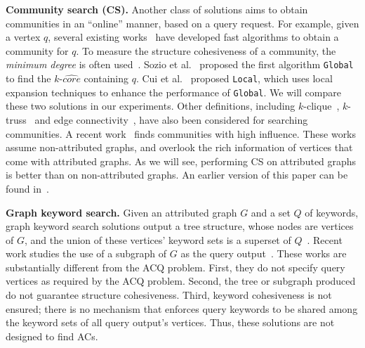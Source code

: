 \textbf{Community search (CS).}  Another class of solutions aims to obtain communities in an ``online'' manner, based on a query request. For example, given a vertex $q$, several existing works~\cite{KDD2010,local2014,vldb2015,online-sigmod2013,k-truss2014} have developed fast algorithms to obtain a community for $q$.
To measure the structure cohesiveness of a community, the {\it minimum degree} is often used~\cite{KDD2010,local2014,vldb2015}. Sozio et al.~\cite{KDD2010} proposed the first algorithm {\tt Global} to find the $k$-$\widehat{core}$ containing $q$.
Cui et al.~\cite{local2014} proposed {\tt Local}, which uses local expansion techniques to enhance the performance of {\tt Global}. We will compare these two solutions in our experiments.
Other definitions, including $k$-clique~\cite{online-sigmod2013}, $k$-truss~\cite{k-truss2014} and edge connectivity~\cite{hu2016querying}, have also been considered for searching communities. A recent work~\cite{vldb2015} finds communities with high influence.  These works assume non-attributed graphs, and overlook the rich information of vertices that come with attributed graphs. As we will see, performing CS on attributed graphs is better than on non-attributed graphs.
An earlier version of this paper can be found in~\cite{fang2016effective}.

\textbf{Graph keyword search.}  Given an attributed graph $G$ and a set $Q$ of keywords, graph keyword search solutions output a tree structure, whose nodes are vertices of $G$, and the union of these vertices' keyword sets is a superset of $Q$~\cite{keyword-icde2007,keyword-vldb2005}. Recent work studies the use of a subgraph of $G$ as the query output~\cite{keyword-vldb2011}. These works are substantially different from the ACQ problem. First, they do not specify query vertices as required by the ACQ problem. Second, the tree or subgraph produced do not guarantee structure cohesiveness. Third, keyword cohesiveness is not ensured; there is no mechanism that enforces query keywords to be shared among the keyword sets of all query output's vertices. Thus, these solutions are not designed to find ACs.


